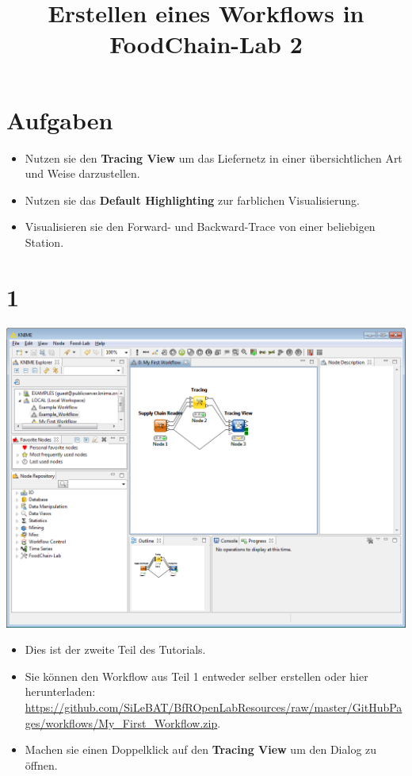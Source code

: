\documentclass{beamer}
\title{Erstellen eines Workflows in FoodChain-Lab 2}
\date{}
\begin{document}
\maketitle

\section{Aufgaben}
\begin{frame}
	\begin{itemize}
		\item Nutzen sie den \textbf{Tracing View} um das Liefernetz in einer übersichtlichen Art und Weise darzustellen.
		\item Nutzen sie das \textbf{Default Highlighting} zur farblichen Visualisierung.
		\item Visualisieren sie den Forward- und Backward-Trace von einer beliebigen Station.
	\end{itemize}
\end{frame}
 
\section{1}
\begin{frame}
	\begin{center}
  		\includegraphics[height=0.5\textheight]{1.png}
	\end{center}
	\begin{itemize}
		\item Dies ist der zweite Teil des Tutorials.
		\item Sie können den Workflow aus Teil 1 entweder selber erstellen oder hier herunterladen: \url{https://github.com/SiLeBAT/BfROpenLabResources/raw/master/GitHubPages/workflows/My_First_Workflow.zip}.
		\item Machen sie einen Doppelklick auf den \textbf{Tracing View} um den Dialog zu öffnen.
	\end{itemize}
\end{frame}
\end{document}
